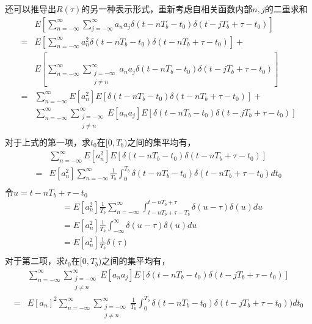 \documentclass[
]{article}
\begin{document}
还可以推导出$R(\tau)$的另一种表示形式，重新考虑自相关函数内部$n,j$的二重求和
\begin{equation}
\begin{aligned}
&E[\sum\limits_{n=-\infty}^{\infty} \sum\limits_{j=-\infty}^{\infty} a_n a_j \delta(t-nT_b-t_0) \delta(t-jT_b+\tau-t_0) ]\\
=&E[\sum\limits_{n=-\infty}^{\infty} a_n^2 \delta(t-nT_b-t_0) \delta(t-nT_b+\tau-t_0)]+\\
&E[\sum\limits_{n=-\infty}^{\infty} \sum\limits_{\substack{j=-\infty\\j\neq n}}^{\infty} a_n a_j \delta(t-nT_b-t_0) \delta(t-jT_b+\tau-t_0)]\\
=&\sum\limits_{n=-\infty}^{\infty} E[a_n^2] E[\delta(t-nT_b-t_0) \delta(t-nT_b+\tau-t_0)]+\\
&\sum\limits_{n=-\infty}^{\infty} \sum\limits_{\substack{j=-\infty\\j\neq n}}^{\infty} E[a_n a_j] E[\delta(t-nT_b-t_0) \delta(t-jT_b+\tau-t_0)]\\
\end{aligned}
\end{equation}
对于上式的第一项，求$t_0$在$[0,T_b)$之间的集平均有，
\begin{equation}
\begin{aligned}
&\sum\limits_{n=-\infty}^{\infty} E[a_n^2] E[\delta(t-nT_b-t_0) \delta(t-nT_b+\tau-t_0)]\\
=&E[a_n^2] \sum\limits_{n=-\infty}^{\infty} \frac{1}{T_b} \int_{0}^{T_b}\delta(t-nT_b-t_0) \delta(t-nT_b+\tau-t_0) d t_0\\
\end{aligned}
\end{equation}
令$u=t-nT_b+\tau-t_0$
\begin{equation}
\begin{aligned}
&= E[a_n^2] \frac{1}{T_b} \sum\limits_{n=-\infty}^{\infty} \int_{t-nT_b+\tau-T_b}^{t-nT_b+\tau}\delta(u-\tau) \delta(u) du\\
&= E[a_n^2] \frac{1}{T_b} \int_{-\infty}^{\infty}\delta(u-\tau) \delta(u) du\\
&= E[a_n^2] \frac{1}{T_b} \delta(\tau)\\
\end{aligned}
\end{equation}
对于第二项，求$t_0$在$[0,T_b)$之间的集平均有，
\begin{equation}
\begin{aligned}
&\sum\limits_{n=-\infty}^{\infty} \sum\limits_{\substack{j=-\infty\\j\neq n}}^{\infty} E[a_n a_j] E[\delta(t-nT_b-t_0) \delta(t-jT_b+\tau-t_0)]\\
=&E[a_n]^2 \sum\limits_{n=-\infty}^{\infty} \sum\limits_{\substack{j=-\infty\\j\neq n}}^{\infty} \frac{1}{T_b} \int_{0}^{T_b}\delta(t-nT_b-t_0) \delta(t-jT_b+\tau-t_0)) d t_0\\
\end{aligned}
\end{equation}
\end{document}

